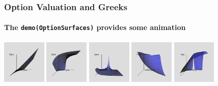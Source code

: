 \documentclass[compress]{beamer}
\begin{document}
\begin{frame}
  \frametitle{Option Valuation and Greeks}
  \framesubtitle{The \texttt{demo(OptionSurfaces)} provides some animation}


  \includegraphics[width=0.82in]{figures/animation/Value01}
  \includegraphics[width=0.82in]{figures/animation/Delta01}
  \includegraphics[width=0.82in]{figures/animation/Gamma01}
  \includegraphics[width=0.82in]{figures/animation/Theta01}
  \includegraphics[width=0.82in]{figures/animation/Vega01}


\end{frame}
\end{document}
